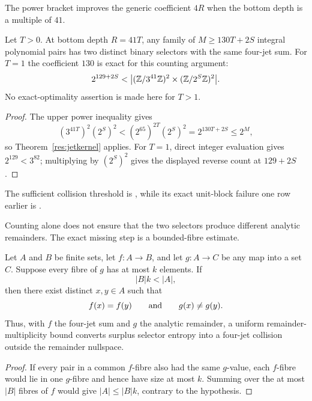 \documentclass[11pt]{article}
\begin{document}
The power bracket improves the generic coefficient $4R$ when the bottom depth
is a multiple of $41$.

\begin{corollary}\label{res:rankfortyone}
Let $T>0$.  At bottom depth $R=41T$, any family of
$M\ge130T+2S$ integral polynomial pairs has two distinct binary selectors
with the same four-jet sum.  For $T=1$ the coefficient $130$ is exact for
this counting argument:
\[
 2^{129+2S}<\bigl| (\mathbb{Z}/3^{41}\mathbb{Z})^2\times
                       (\mathbb{Z}/2^S\mathbb{Z})^2\bigr|.
\]
No exact-optimality assertion is made here for $T>1$.
\end{corollary}

\begin{proof}
The upper power inequality gives
\[
 (3^{41T})^2(2^S)^2
 <(2^{65})^{2T}(2^S)^2=2^{130T+2S}\le2^M,
\]
so Theorem~\ref{res:jetkernel} applies.  For $T=1$, direct integer
evaluation gives $2^{129}<3^{82}$; multiplying by $(2^S)^2$ gives the
displayed reverse count at $129+2S$.
\end{proof}

\noindent The sufficient collision threshold is
,
while its exact unit-block failure one row earlier is
.

Counting alone does not ensure that the two selectors produce different
analytic remainders.  The exact missing step is a bounded-fibre estimate.

\begin{theorem}\label{res:boundedfibre}
Let $A$ and $B$ be finite sets, let $f:A\to B$, and let $g:A\to C$ be any
map into a set $C$.  Suppose every fibre of $g$ has at most $k$ elements.  If
\[
 |B|k<|A|,
\]
then there exist distinct $x,y\in A$ such that
\[
 f(x)=f(y)\qquad\hbox{and}\qquad g(x)\ne g(y).
\]
Thus, with $f$ the four-jet sum and $g$ the analytic remainder, a uniform
remainder-multiplicity bound converts surplus selector entropy into a
four-jet collision outside the remainder nullspace.
\end{theorem}

\begin{proof}
If every pair in a common $f$-fibre also had the same $g$-value, each
$f$-fibre would lie in one $g$-fibre and hence have size at most $k$.
Summing over the at most $|B|$ fibres of $f$ would give
$|A|\le |B|k$, contrary to the hypothesis.
\end{proof}
\end{document}
